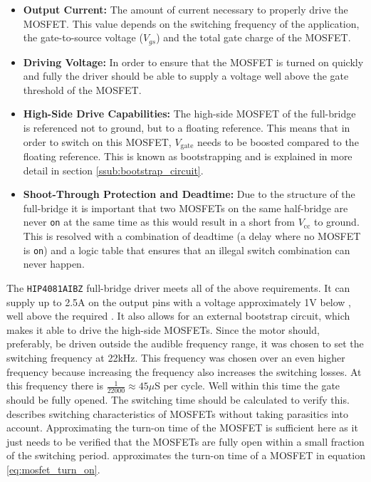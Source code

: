 \begin{itemize}
	\item \textbf{Output Current:} The amount of current necessary to properly drive the MOSFET.
	This value depends on the switching frequency of the application, the gate-to-source voltage ($V_{gs}$) and the total gate charge of the MOSFET.
	\item \textbf{Driving Voltage:} In order to ensure that the MOSFET is turned on quickly and fully the driver should be able to supply a voltage well above the gate threshold of the MOSFET.
	\item \textbf{High-Side Drive Capabilities:} The high-side MOSFET of the full-bridge is referenced not to ground, but to a floating reference.
	This means that in order to switch on this MOSFET, $V_{\text{gate}}$ needs to be boosted compared to the floating reference. 
	This is known as bootstrapping and is explained in more detail in section \ref{ssub:bootstrap_circuit}.
	\item \textbf{Shoot-Through Protection and Deadtime:} Due to the structure of the full-bridge it is important that two MOSFETs on the same half-bridge are never \texttt{on} at the same time as this would result in a short from $V_{\text{cc}}$ to ground.
	This is resolved with a combination of deadtime (a delay where no MOSFET is \texttt{on}) and a logic table that ensures that an illegal switch combination can never happen.
\end{itemize}

The \texttt{HIP4081AIBZ} \cite{driver} full-bridge driver meets all of the above requirements.
It can supply up to 2.5A on the output pins with a voltage approximately 1V below \vcc, well above the required \vth.
It also allows for an external bootstrap circuit, which makes it able to drive the high-side MOSFETs.
Since the motor should, preferably, be driven outside the audible frequency range, it was chosen to set the switching frequency at 22kHz.
This frequency was chosen over an even higher frequency because increasing the frequency also increases the switching losses.
At this frequency there is $\frac{1}{22000}\approx45\mu$S per cycle. 
Well within this time the gate should be fully opened.
The switching time should be calculated to verify this.
\cite{mosfet_switch_app_note} describes switching characteristics of MOSFETs without taking parasitics into account.
Approximating the turn-on time of the MOSFET is sufficient here as it just needs to be verified that the MOSFETs are fully open within a small fraction of the switching period.
\cite{mosfet_switch_app_note} approximates the turn-on time of a MOSFET in equation \ref{eq:mosfet_turn_on}.

